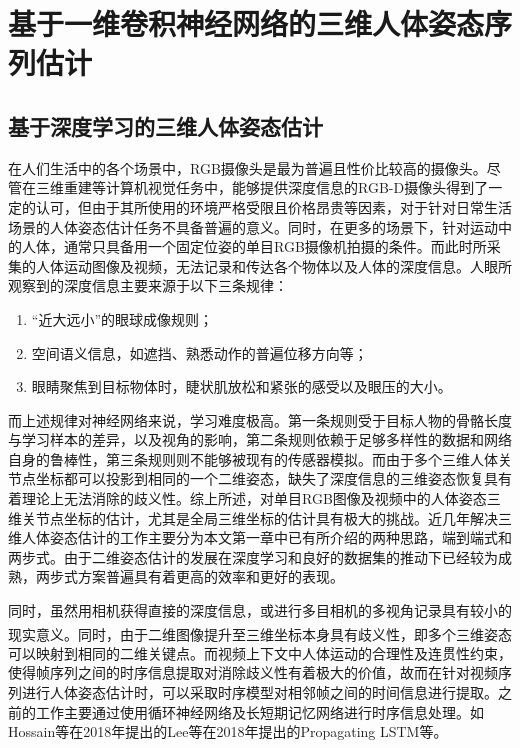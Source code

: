 
\chapter{基于一维卷积神经网络的三维人体姿态序列估计}


\section{基于深度学习的三维人体姿态估计}


在人们生活中的各个场景中，RGB摄像头是最为普遍且性价比较高的摄像头。尽管在三维重建等计算机视觉任务中，能够提供深度信息的RGB-D摄像头得到了一定的认可，但由于其所使用的环境严格受限且价格昂贵等因素，对于针对日常生活场景的人体姿态估计任务不具备普遍的意义。同时，在更多的场景下，针对运动中的人体，通常只具备用一个固定位姿的单目RGB摄像机拍摄的条件。而此时所采集的人体运动图像及视频，无法记录和传达各个物体以及人体的深度信息。人眼所观察到的深度信息主要来源于以下三条规律：

\begin{enumerate}
    \item “近大远小”的眼球成像规则；
    \item 空间语义信息，如遮挡、熟悉动作的普遍位移方向等；
    \item 眼睛聚焦到目标物体时，睫状肌放松和紧张的感受以及眼压的大小。
\end{enumerate}

而上述规律对神经网络来说，学习难度极高。第一条规则受于目标人物的骨骼长度与学习样本的差异，以及视角的影响，第二条规则依赖于足够多样性的数据和网络自身的鲁棒性，第三条规则则不能够被现有的传感器模拟。而由于多个三维人体关节点坐标都可以投影到相同的一个二维姿态，缺失了深度信息的三维姿态恢复具有着理论上无法消除的歧义性。综上所述，对单目RGB图像及视频中的人体姿态三维关节点坐标的估计，尤其是全局三维坐标的估计具有极大的挑战。近几年解决三维人体姿态估计的工作主要分为本文第一章中已有所介绍的两种思路，端到端式和两步式。由于二维姿态估计的发展在深度学习和良好的数据集的推动下已经较为成熟，两步式方案普遍具有着更高的效率和更好的表现。

同时，虽然用相机获得直接的深度信息，或进行多目相机的多视角记录具有较小的现实意义。同时，由于二维图像提升至三维坐标本身具有歧义性\textsuperscript{\cite{p12}}，即多个三维姿态可以映射到相同的二维关键点。而视频上下文中人体运动的合理性及连贯性约束，使得帧序列之间的时序信息提取对消除歧义性有着极大的价值，故而在针对视频序列进行人体姿态估计时，可以采取时序模型对相邻帧之间的时间信息进行提取。之前的工作主要通过使用循环神经网络及长短期记忆网络进行时序信息处理。如Hossain等在2018年提出的Lee等在2018年提出的Propagating LSTM等。

